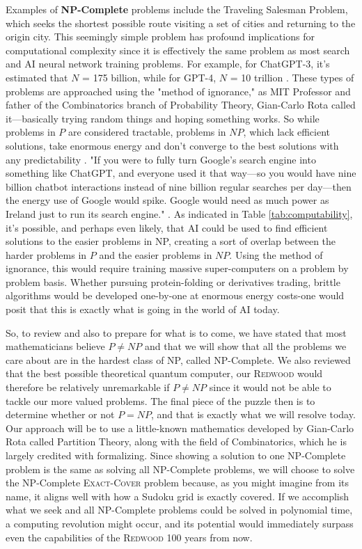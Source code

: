 \documentclass{report}
\begin{document}
Examples of \textbf{NP-Complete} problems include the Traveling Salesman Problem, which seeks the shortest possible route visiting a set of cities and returning to the origin city. This seemingly simple problem has profound implications for computational complexity since it is effectively the same problem as most search and AI neural network training problems. For example, for ChatGPT-3, it's estimated that \(N\) = 175 billion, while for GPT-4, \(N\) = 10 trillion \cite{GPT3vsGPT4vsGPT5}. These types of problems are approached using the "method of ignorance," as MIT Professor and father of the Combinatorics branch of Probability Theory, Gian-Carlo Rota called it—basically trying random things and hoping something works. So while problems in \(P\) are considered tractable, problems in \(NP\), which lack efficient solutions, take enormous energy and don't converge to the best solutions with any predictability \cite{Rota1997}. "If you were to fully turn Google’s search engine into something like ChatGPT, and everyone used it that way—so you would have nine billion chatbot interactions instead of nine billion regular searches per day—then the energy use of Google would spike. Google would need as much power as Ireland just to run its search engine." \cite{AIelectricity}.
As indicated in Table \ref{tab:computability}, it's possible, and perhaps even likely, that AI could be used to find efficient solutions to the easier problems in NP, creating a sort of overlap between the harder problems in \(P\) and the easier problems in \(NP\). Using the method of ignorance, this would require training massive super-computers on a problem by problem basis. Whether pursuing protein-folding or derivatives trading, brittle algorithms would be developed one-by-one at enormous energy costs-one would posit that this is exactly what is going in the world of AI today.

So, to review and also to prepare for what is to come, we have stated that most mathematicians believe \(P \neq NP\) and that we will show that all the problems we care about are in the hardest class of NP, called NP-Complete. We also reviewed that the best possible theoretical quantum computer, our \textsc{Redwood} would therefore be relatively unremarkable if \(P \neq NP\) since it would not be able to tackle our more valued problems. The final piece of the puzzle then is to determine whether or not \(P = NP\), and that is exactly what we will resolve today. Our approach will be to use a little-known mathematics developed by Gian-Carlo Rota called Partition Theory, along with the field of Combinatorics, which he is largely credited with formalizing. Since showing a solution to one NP-Complete problem is the same as solving all NP-Complete problems, we will choose to solve the NP-Complete \textsc{Exact-Cover} problem because, as you might imagine from its name, it aligns well with how a Sudoku grid is exactly covered. If we accomplish what we seek and all NP-Complete problems could be solved in polynomial time, a computing revolution might occur\cite{50yearsofPvsNP}, and its potential would immediately surpass even the capabilities of the \textsc{Redwood} 100 years from now.
\end{document}
